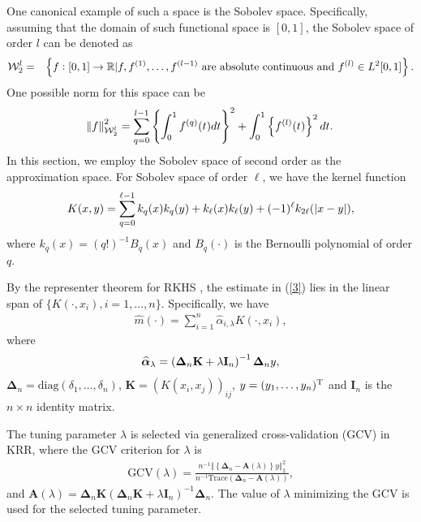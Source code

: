 \documentclass[12pt]{article}
\newcommand{\bA}{\mathbf{A}}
\newcommand{\bx}{{x}}
\newcommand{\by}{{y}}
\newcommand{\bI}{\mathbf{I}}
\newcommand{\bK}{\mathbf{K}}
\newcommand{\balpha}{\boldsymbol{\alpha}}
\newcommand{\bDelta}{\boldsymbol{\Delta}}
\def\trans{^{\rm T}}
\def\wh{\widehat}
\newcommand{\Norm}[1]{\left\Vert#1\right\Vert}
\begin{document}
One 
canonical example of such a space is the Sobolev space. Specifically, assuming that  the domain of such functional space is $[0,1]$,
 the Sobolev space of order $l$ can be denoted as 
\begin{eqnarray}
	\mathcal{W}_{2}^{l} &=& \left\{ f:[0,1] \rightarrow \mathbb{R} |
	 f, f^{(1)}, \dots, f^{(l-1)} \mbox{ are absolute continuous and } f^{(l)} \in L^{2}[0,1]    \right\}. \notag 
\end{eqnarray}
One possible norm for this space can be
\begin{eqnarray}
	\norm{f}_{\mathcal{W}_{2}^{l}}^{2} = \sum_{q = 0}^{l-1}\left\{   \int_{0}^{1}f^{(q)}(t)dt      \right\}^{2} +
	 \int_{0}^{1}\left\{f^{(l)}(t) \right\}^{2}dt . \notag 
\end{eqnarray}
In this section, we employ the Sobolev space of second order as the approximation space. 
For Sobolev space of order $\ell$, we have the kernel function
\begin{align}
K(x,y) = \sum_{q = 0}^{\ell-1}k_{q}(x)k_{q}(y) + k_{\ell}(x)k_{\ell}(y)
 + (-1)^{\ell}   k_{2\ell}(|x-y|),\notag 
\end{align}
where $k_{q}(x) = (q!)^{-1}B_{q}(x)$ and $B_{q}(\cdot)$ is the Bernoulli polynomial of order $q$.




By the representer theorem for RKHS \citep{wahba1990spline}, the estimate  in (\ref{3})  lies in the linear span of $\{K(\cdot, \bx_{i}), i = 1,\ldots, n\}$.
Specifically, we have 
\begin{align}\label{KRR}
\wh{m}(\cdot) = \sum_{i=1}^{n}\wh{\alpha}_{i,\lambda}K(\cdot, \bx_{i}),
\end{align}
where 
\begin{align}
\wh{\balpha}_{\lambda} = \left(\bDelta_{n}\bK +  \lambda\bI_{n}\right)^{-1}\bDelta_n \by,\notag
\end{align}
$\bDelta_{n} = \mbox{diag}(\delta_{1}, \ldots, \delta_{n})$, $\bK = (K(\bx_{i}, \bx_{j}))_{ij} $,  $\by = (y_{1},\ldots, y_{n})\trans$ and $\bI_{n}$ is the $n\times n$ identity matrix.

The tuning parameter $\lambda$ is selected via generalized cross-validation (GCV) in KRR, where the GCV criterion for $\lambda$ is
\begin{align}\label{GCV}
 \mbox{GCV}(\lambda) = \frac{n^{-1}   \Norm{ \left\{\bDelta_{n} - \bA(\lambda)\right\}\by }_{2}^{2}   }{n^{-1}  \mbox{Trace}(\bDelta_{n} - \bA(\lambda) )  },
\end{align}
and $\bA(\lambda) = \bDelta_{n}\bK  ( \bDelta_{n} \bK + \lambda \bI_{n}  )^{-1} \bDelta_{n}  $. The value of $\lambda$ minimizing the GCV is used for the selected tuning parameter. 
\end{document}
